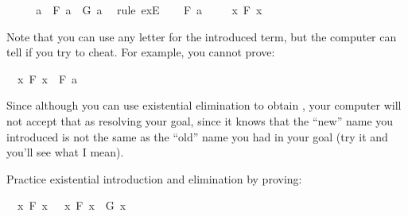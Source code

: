 \begin{isabellebody}
\ \ \isamarkupfalse%
\ \isamarkupfalse%
\ a\ \ {\isachardoublequoteopen}F\ a\ {\isasymand}\ G\ a{\isachardoublequoteclose}\ \isamarkupfalse%
\ {\isacharparenleft}rule\ exE{\isacharparenright}\isanewline
\ \ \isamarkupfalse%
\ {\isachardoublequoteopen}F\ a{\isachardoublequoteclose}\isacommand{{\isachardot}{\isachardot}}\isamarkupfalse%
\isanewline
\ \ \isamarkupfalse%
\ {\isachardoublequoteopen}{\isasymexists}\ x{\isachardot}\ F\ x{\isachardoublequoteclose}\isacommand{{\isachardot}{\isachardot}}\isamarkupfalse%
\isanewline
{}\isamarkupfalse%
%
\endisatagproof
{\isafoldproof}%
%
\isadelimproof
%
\endisadelimproof
%
\begin{isamarkuptext}%
Note that you can use any letter for the introduced term, but the computer can tell if you
try to cheat. For example, you cannot prove:%
\end{isamarkuptext}\isamarkuptrue%
\isamarkupfalse%
\ {\isachardoublequoteopen}{\isacharparenleft}{\isasymexists}\ x{\isachardot}\ F\ x{\isacharparenright}\ {\isasymlongrightarrow}\ F\ a{\isachardoublequoteclose}%
\isadelimproof
\ %
\endisadelimproof
%
\isatagproof
{}\isamarkupfalse%
%
\endisatagproof
{\isafoldproof}%
%
\isadelimproof
%
\endisadelimproof
%
\begin{isamarkuptext}%
Since although you can use existential elimination to obtain , your computer
will not accept that as resolving your goal, since it knows that the ``new'' name you introduced is
not the same as the ``old'' name you had in your goal (try it and you'll see what I mean).%
\end{isamarkuptext}\isamarkuptrue%
%
\begin{isamarkuptext}%
\begin{Exercise} Practice existential introduction and elimination by proving: \end{Exercise}%
\end{isamarkuptext}\isamarkuptrue%
\isamarkupfalse%
\ {\isachardoublequoteopen}{\isacharparenleft}{\isasymexists}\ x{\isachardot}\ F\ x{\isacharparenright}\ {\isasymlongrightarrow}\ {\isacharparenleft}{\isasymexists}\ x{\isachardot}\ F\ x\ {\isasymor}\ G\ x{\isacharparenright}{\isachardoublequoteclose}%
\isadelimproof
\ %
\endisadelimproof
%
\isatagproof
{}\isamarkupfalse%
%
\endisatagproof
{\isafoldproof}%
%
\isadelimproof
%
\endisadelimproof
%
\begin{isamarkuptext}%

\end{isamarkuptext}
\end{isabellebody}
